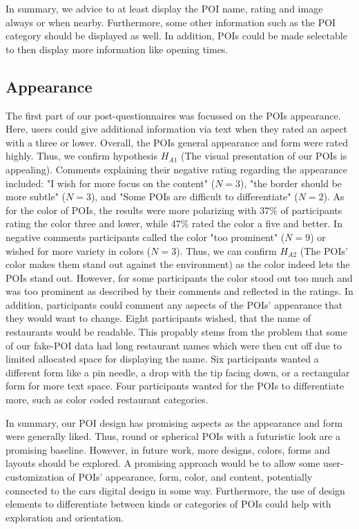 In summary, we advice to at least display the POI name, rating and image always or when nearby. Furthermore, some other information such as the POI category should be displayed as well. In addition, POIs could be made selectable to then display more information like opening times.



\subsection{Appearance}
The first part of our post-questionnaires was focussed on the POIs appearance. Here, users could give additional information via text when they rated an aspect with a three or lower. Overall, the POIs general appearance and form were rated highly. Thus, we confirm hypothesis $H_{A1}$ (The visual presentation of our POIs is appealing). Comments explaining their negative rating regarding the appearance included: "I wish for more focus on the content" ($N=3$), "the border should be more subtle" ($N=3$), and "Some POIs are difficult to differentiate" ($N=2$). As for the color of POIs, the results were more polarizing with 37\% of participants rating the color three and lower, while 47\% rated the color a five and better. In negative comments participants called the color "too prominent" ($N=9$) or wished for more variety in colors ($N=3$). Thus, we can confirm $H_{A2}$ (The POIs' color makes them stand out against the environment) as the color indeed lets the POIs stand out. However, for some participants the color stood out too much and was too prominent as described by their comments and reflected in the ratings. In addition, participants could comment any aspects of the POIs' appearance that they would want to change. Eight participants wished, that the name of restaurants would be readable. This propably stems from the problem that some of our fake-POI data had long restaurant names which were then cut off due to limited allocated space for displaying the name. Six participants wanted a different form like a pin needle, a drop with the tip facing down, or a rectangular form for more text space. Four participants wanted for the POIs to differentiate more, such as color coded restaurant categories.

In summary, our POI design has promising aspects as the appearance and form were generally liked. Thus, round or spherical POIs with a futuristic look are a promising baseline. However, in future work, more designs, colors, forms and layouts should be explored. A promising approach would be to allow some user-customization of POIs' appearance, form, color, and content, potentially connected to the cars digital design in some way. Furthermore, the use of design elements to differentiate between kinds or categories of POIs could help with exploration and orientation.


